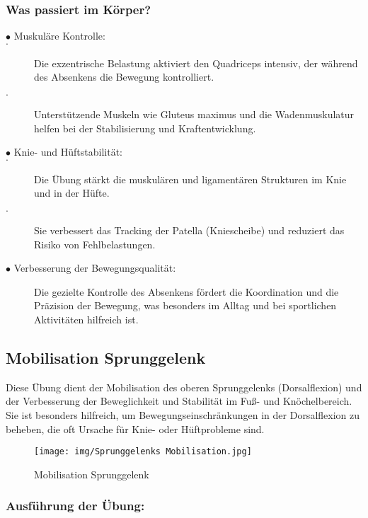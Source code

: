 \subsubsection{Was passiert im Körper?}

\begin{description}
    \item[$\bullet$ Muskuläre Kontrolle:]

    \item[$\cdot$] Die exzentrische Belastung aktiviert den Quadriceps intensiv, der während des Absenkens die Bewegung kontrolliert.
    \item[$\cdot$] Unterstützende Muskeln wie Gluteus maximus und die Wadenmuskulatur helfen bei der Stabilisierung und Kraftentwicklung.

    \item[$\bullet$ Knie- und Hüftstabilität:]
        \item[$\cdot$]Die Übung stärkt die muskulären und ligamentären Strukturen im Knie und in der Hüfte.
        \item[$\cdot$]Sie verbessert das Tracking der Patella (Kniescheibe) und reduziert das Risiko von Fehlbelastungen.
    \item[$\bullet$ Verbesserung der Bewegungsqualität:] Die gezielte Kontrolle des Absenkens fördert die Koordination und die Präzision der Bewegung, was besonders im Alltag und bei sportlichen Aktivitäten hilfreich ist.

\end{description}

\subsection{Mobilisation Sprunggelenk}

Diese Übung dient der Mobilisation des oberen Sprunggelenks (Dorsalflexion) und der Verbesserung der Beweglichkeit und Stabilität im Fuß- und Knöchelbereich. Sie ist besonders hilfreich, um Bewegungseinschränkungen in der Dorsalflexion zu beheben, die oft Ursache für Knie- oder Hüftprobleme sind.

\begin{figure}
    \centering
    \texttt{[image: img/Sprunggelenks Mobilisation.jpg]}
    \caption{Mobilisation Sprunggelenk}
    \label{Mobilisation Sprunggelenk}
\end{figure}


\subsubsection{Ausführung der Übung:}

